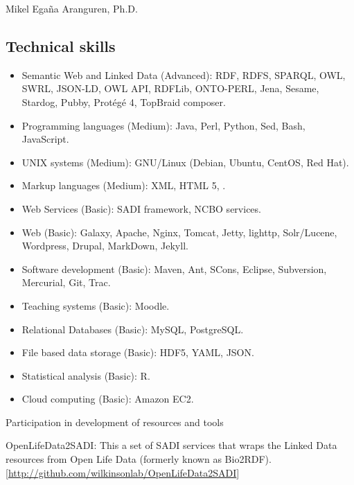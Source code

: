 \documentclass[english,11pt,a4paper,oneside]{article}
\begin{document}
\begin{cv}{Mikel Ega\~na Aranguren, Ph.D. }
\subsection*{Technical skills}
\begin{itemize}
	\item Semantic Web and Linked Data (Advanced): RDF, RDFS, SPARQL, OWL, SWRL, JSON-LD, OWL API, RDFLib, ONTO-PERL, Jena, Sesame, Stardog, Pubby, Prot\'eg\'e 4, TopBraid composer.
	\item Programming languages (Medium): Java, Perl, Python, Sed, Bash, JavaScript. 
	\item UNIX systems (Medium): GNU/Linux (Debian, Ubuntu, CentOS, Red Hat). 
	\item Markup languages (Medium): XML, HTML 5, \LaTeXe.
	\item Web Services (Basic): SADI framework, NCBO services.
	\item Web (Basic): Galaxy, Apache, Nginx, Tomcat, Jetty, lighttp, Solr/Lucene, Wordpress, Drupal, MarkDown, Jekyll.
	\item Software development (Basic): Maven, Ant, SCons, Eclipse, Subversion, Mercurial, Git, Trac.
	\item Teaching systems (Basic): Moodle.
	\item Relational Databases (Basic): MySQL, PostgreSQL.
	\item File based data storage (Basic): HDF5, YAML, JSON.
	\item Statistical analysis (Basic): R.
	\item Cloud computing (Basic): Amazon EC2.
\end{itemize}

\begin{cvlist}{Participation in development of resources and tools}



	\item [OpenLifeData2SADI:] This a set of SADI services that wraps the Linked Data resources from Open Life Data (formerly known as Bio2RDF). 
[\href{http://github.com/wilkinsonlab/OpenLifeData2SADI}{http://github.com/wilkinsonlab/OpenLifeData2SADI}]


\end{cvlist}
\end{cv}
\end{document}
